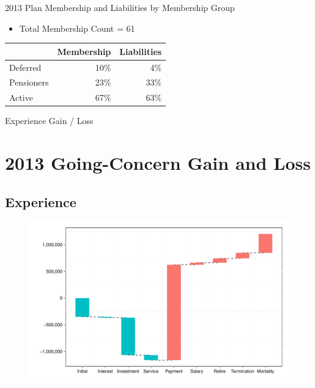 \documentclass{beamer}
\begin{document}
\begin{frame}{2013 Plan Membership and Liabilities by Membership Group} 

\begin{itemize}
\item Total Membership Count = 61
\end{itemize}

\begin{table}[ht]
\begin{tabular}{l r r}
\hline
& Membership & Liabilities \\ \hline
Deferred  & 10\% & 4\% \\
Pensioners & 23\% & 33\% \\
Active & 67\% & 63\% \\ \hline
\end{tabular}
\end{table}

\end{frame}

\begin{frame}{Experience Gain / Loss}

\section{2013 Going-Concern Gain and Loss}

\subsection{Experience}

\begin{figure}
\includegraphics[width=1.0\textwidth]{waterfall}
\end{figure}

\end{frame}
\end{document}
